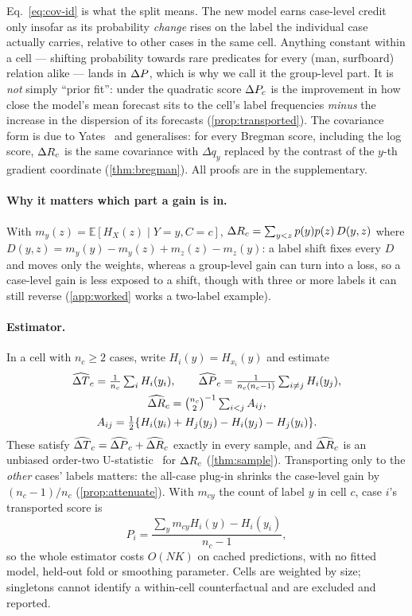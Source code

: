 \noindent Eq.~\eqref{eq:cov-id} is what the split means. The new model earns case-level
credit only insofar as its probability \emph{change} rises on the label the individual case
actually carries, relative to other cases in the same cell. Anything constant within a cell
--- shifting probability towards rare predicates for every (\textsf{man}, \textsf{surfboard})
relation alike --- lands in $\Delta P$, which is why we call it the group-level part. It is
\emph{not} simply ``prior fit'': under the quadratic score $\Delta P_c$ is the improvement in how
close the model's mean forecast sits to the cell's label frequencies \emph{minus} the
increase in the dispersion of its forecasts (\cref{prop:transported}). The covariance form is
due to Yates~\cite{yates1982external} and generalises: for every Bregman score, including the
log score, $\Delta R_c$ is the same covariance with $\Delta q_y$ replaced by the contrast of the
$y$-th gradient coordinate (\cref{thm:bregman}). All proofs are in the supplementary.

\paragraph{Why it matters which part a gain is in.} With
$m_y(z)=\mathbb E[H_X(z)\mid Y=y,C=c]$, $\Delta R_c=\sum_{y<z}p(y)p(z)\,D(y,z)$ where
$D(y,z)=m_y(y)-m_y(z)+m_z(z)-m_z(y)$: a label shift fixes every $D$ and moves only the
weights, whereas a group-level gain can turn into a loss, so a case-level gain is less exposed
to a shift, though with three or more labels it can still reverse (\cref{app:worked} works a
two-label example).

\paragraph{Estimator.} In a cell with $n_c\ge2$ cases, write $H_i(y)=H_{x_i}(y)$ and estimate
\begin{gather}
\widehat{\Delta T}_c=\tfrac1{n_c}\textstyle\sum_iH_i(y_i),\qquad
\widehat{\Delta P}_c=\tfrac1{n_c(n_c-1)}\textstyle\sum_{i\ne j}H_i(y_j),
\label{eq:sample-prior}\\
\widehat{\Delta R}_c=\tbinom{n_c}{2}^{-1}\textstyle\sum_{i<j}A_{ij},
\label{eq:sample-reason}\\
A_{ij}=\tfrac12\{H_i(y_i)+H_j(y_j)-H_i(y_j)-H_j(y_i)\}.
\label{eq:kernel}
\end{gather}
These satisfy $\widehat{\Delta T}_c=\widehat{\Delta P}_c+\widehat{\Delta R}_c$ exactly in every sample, and $\widehat{\Delta R}_c$ is an unbiased
order-two U-statistic~\cite{hoeffding1948class} for $\Delta R_c$ (\cref{thm:sample}).
Transporting only to the \emph{other} cases' labels matters: the all-case plug-in shrinks
the case-level gain by $(n_c-1)/n_c$ (\cref{prop:attenuate}). With $m_{cy}$ the count
of label $y$ in cell $c$, case $i$'s transported score is
\begin{equation}
P_i=\frac{\sum_{y}m_{cy}H_i(y)-H_i(y_i)}{n_c-1},
\label{eq:linear}
\end{equation}
so the whole estimator costs $O(NK)$ on cached predictions, with no fitted model, held-out
fold or smoothing parameter. Cells are weighted by size; singletons cannot identify a
within-cell counterfactual and are excluded and reported.

